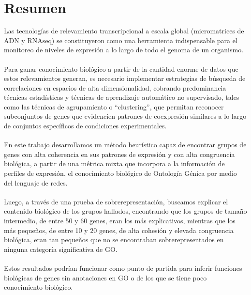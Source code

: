 \chapter*{Resumen}
Las tecnologías de relevamiento transcripcional a escala global (micromatrices de ADN y RNAseq) se constituyeron como una herramienta indispensable para el monitoreo de niveles de expresión a lo largo de todo el genoma de un organismo.\\\\
Para ganar conocimiento biológico a partir de la cantidad enorme de datos que estos relevamientos generan, es necesario implementar estrategias de búsqueda de correlaciones en espacios de alta dimensionalidad, cobrando predominancia técnicas estadísticas y técnicas de aprendizaje automático no supervisado, tales como las técnicas de agrupamiento o ``clustering'', que permitan reconocer subconjuntos de genes que evidencien patrones de coexpresión similares a lo largo de conjuntos específicos de condiciones experimentales.\\\\
En este trabajo desarrollamos un método heurístico capaz de encontrar grupos de genes con alta coherencia en sus patrones de expresión y con alta congruencia biológica, a partir de una métrica mixta que incorpora a la información de perfiles de expresión, el conocimiento biológico de Ontología Génica por medio del lenguaje de redes.\\\\
Luego, a través de una prueba de sobrerepresentación, buscamos explicar el contenido biológico de los grupos hallados, encontrando que los grupos de tamaño intermedio, de entre 50 y 60 genes, eran los más explicativos, mientras que los más pequeños, de entre 10 y 20 genes, de alta cohesión y elevada congruencia biológica, eran tan pequeños que no se encontraban sobrerepresentados en ninguna categoría significativa de GO.\\\\
Estos resultados podrían funcionar como punto de partida para inferir funciones biológicas de genes sin anotaciones en GO o de los que se tiene poco conocimiento biológico.


